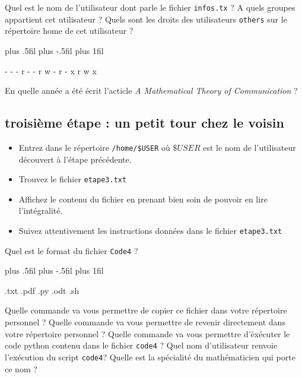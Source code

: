 \documentclass[a4paper,10pt,addpoints]{exam}
\newenvironment{oneparcheckboxescentering}{
	\begingroup
	\leftskip=80mm plus .5fil%
	\rightskip=0mm plus -.5fil%
	\parfillskip=0mm plus 1fil\relax
	\begin{oneparcheckboxes}
	}{
	\end{oneparcheckboxes}
	\par
	\endgroup
}
\begin{document}
\begin{questions}
		\setlength\answerlinelength{8cm}
		\question [2] Quel est le nom de l'utilisateur dont parle le fichier \verb|infos.tx| ?
		\answerline
		\question [1]A quels groupes appartient cet utilisateur ?
		\answerline
		\question [1] Quels sont les droits des utilisateurs \verb|others| sur le répertoire home de cet utilisateur ?
		\newline
		\checkboxchar{$\Box$}
		
		\begin{oneparcheckboxescentering}
			\choice - - - \choice r - -  \choice r w - \choice r - x \choice r w x 
		\end{oneparcheckboxescentering}
	
		\bonusquestion [1] En quelle année a été écrit l'acticle \textit{A Mathematical Theory of Communication} ?
		\answerline

\subsection{troisième étape : un petit tour chez le voisin}
\begin{itemize}[label=$\leadsto$, font=\LARGE \color{blue}]
	\item Entrez dans le répertoire \verb|/home/$USER| où $\$USER$ est le nom de l'utilisateur découvert à l'étape précédente.
	\item Trouvez le fichier \verb|etape3.txt|
	\item Affichez le contenu du fichier en prenant bien soin de pouvoir en lire l'intégralité.
	\item Suivez attentivement les instructions données dans le fichier \verb|etape3.txt|
\end{itemize}
\question [1]Quel est le format du fichier \verb|Code4| ?
\newline

\begin{oneparcheckboxescentering}
	\choice .txt \choice .pdf  \choice .py \choice .odt \choice .sh 
\end{oneparcheckboxescentering}
\question [1] Quelle commande va vous permettre de copier ce fichier dans votre répertoire personnel ?
\answerline
\question[\half] Quelle commande va vous permettre de revenir directement dans votre répertoire personnel ?
\answerline
\question[\half] Quelle commande va vous permettre d'éxécuter le code python contenu dans le fichier \verb|code4| ?
\answerline
\question [1] Quel nom d'utilisateur renvoie l'exécution du script \verb|code4|?
\answerline
\bonusquestion [1] Quelle est la spécialité du mathématicien qui porte ce nom ?
\newline


\end{questions}
\end{document}
